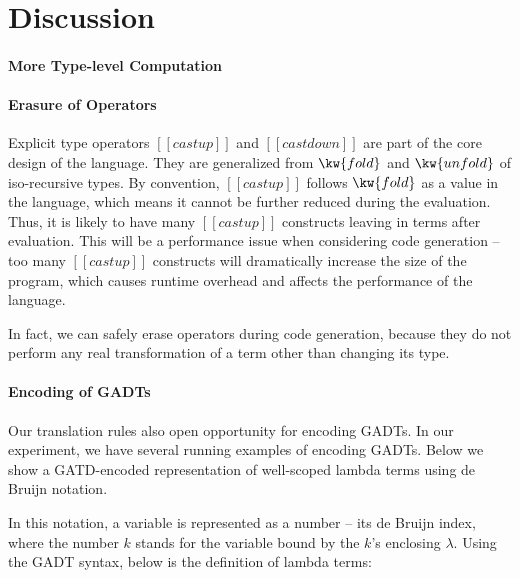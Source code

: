 \visiblecomments

\newlength{\blanklineskip}
\setlength{\blanklineskip}{0.66084ex}

\newcommand{\hsindent}[1]{\quad}%
\let\hspre\empty
\let\hspost\empty
\newcommand{\NB}{\textbf{NB}}
\newcommand{\Todo}[1]{$\langle$\textbf{To do:}~#1$\rangle$}

\EndFmtInput
\makeatother
%


\section{Discussion}
\paragraph{More Type-level Computation}


\paragraph{Erasure of \cast Operators}

Explicit type \cast operators $[[castup]]$ and $[[castdown]]$ are part of the core design of the language. They are generalized from $\kw{fold}$ and $\kw{unfold}$ of iso-recursive types. By convention, $[[castup]]$ follows $\kw{fold}$ as a value in the language, which means it cannot be further reduced during the evaluation. Thus, it is likely to have many $[[castup]]$ constructs leaving in terms after evaluation. This will be a performance issue when considering code generation -- too many $[[castup]]$ constructs will dramatically increase the size of the program, which causes runtime overhead and affects the performance of the language.

In fact, we can safely erase \cast operators during code generation, because they do not perform any real transformation of a term other than changing its type.

\paragraph{Encoding of GADTs}

Our translation rules also open opportunity for encoding GADTs. In our
experiment, we have several running examples of encoding GADTs. Below
we show a GATD-encoded representation of well-scoped lambda terms
using de Bruijn notation.

In this notation, a variable is represented as a number -- its de
Bruijn index, where the number $k$ stands for the variable bound by
the $k$'s enclosing $\lambda$. Using the GADT syntax, below is the
definition of lambda terms:

